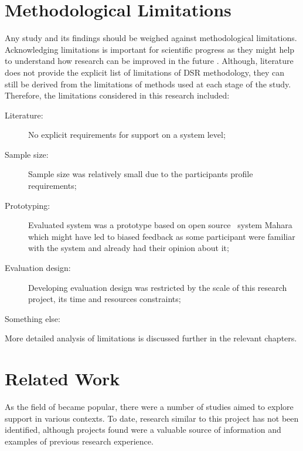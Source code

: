 \section{Methodological Limitations}
\label{sec:limits}

Any study and its findings should be weighed against methodological limitations.
Acknowledging limitations is important for scientific progress as they might help
to understand how research can be improved in the future \citep{Ioannidis2007}.
Although, literature does not provide the explicit list of limitations of DSR
methodology, they can still be derived from the limitations of methods used at
each stage of the study. Therefore, the limitations considered in this research
included:

\begin{description}
\item[Literature:] No explicit requirements for \LLLs support on a system level;
\item[Sample size:] Sample size was relatively small due to the participants
profile requirements;
\item[Prototyping:] Evaluated system was a prototype based on open source
\ep~system Mahara which might have led to biased feedback as some participant
were familiar with the system and already had their opinion about it;
\item[Evaluation design:] Developing evaluation design was restricted by the
scale of this research project, its time and resources constraints; 
\item[Something else:]
\end{description}

More detailed analysis of limitations is discussed further in the relevant
chapters.

\section{Related Work}
\label{sec:related}
As the field of \LLLs became popular, there were a number of studies aimed to
explore \LLLs support in various contexts. To date, research similar to this
project has not been identified, although projects found were a valuable source
of information and examples of previous research experience.

